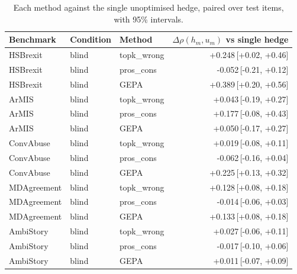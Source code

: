 \begin{table}[t]
\centering
\small
\begin{tabular}{lllr}
\hline
Benchmark & Condition & Method & $\Delta\rho(h_m,u_m)$ vs single hedge \\
\hline
HSBrexit & blind & topk\_wrong & +0.248{\scriptsize\,[+0.02, +0.46]} \\
HSBrexit & blind & pros\_cons & -0.052{\scriptsize\,[-0.21, +0.12]} \\
HSBrexit & blind & GEPA & +0.389{\scriptsize\,[+0.20, +0.56]} \\
ArMIS & blind & topk\_wrong & +0.043{\scriptsize\,[-0.19, +0.27]} \\
ArMIS & blind & pros\_cons & +0.177{\scriptsize\,[-0.08, +0.43]} \\
ArMIS & blind & GEPA & +0.050{\scriptsize\,[-0.17, +0.27]} \\
ConvAbuse & blind & topk\_wrong & +0.019{\scriptsize\,[-0.08, +0.11]} \\
ConvAbuse & blind & pros\_cons & -0.062{\scriptsize\,[-0.16, +0.04]} \\
ConvAbuse & blind & GEPA & +0.225{\scriptsize\,[+0.13, +0.32]} \\
MDAgreement & blind & topk\_wrong & +0.128{\scriptsize\,[+0.08, +0.18]} \\
MDAgreement & blind & pros\_cons & -0.014{\scriptsize\,[-0.06, +0.03]} \\
MDAgreement & blind & GEPA & +0.133{\scriptsize\,[+0.08, +0.18]} \\
AmbiStory & blind & topk\_wrong & +0.027{\scriptsize\,[-0.06, +0.11]} \\
AmbiStory & blind & pros\_cons & -0.017{\scriptsize\,[-0.10, +0.06]} \\
AmbiStory & blind & GEPA & +0.011{\scriptsize\,[-0.07, +0.09]} \\
\hline
\end{tabular}
\caption{Each method against the single unoptimised hedge, paired over test items, with 95\% intervals.}
\label{tab:paired-methods}
\end{table}